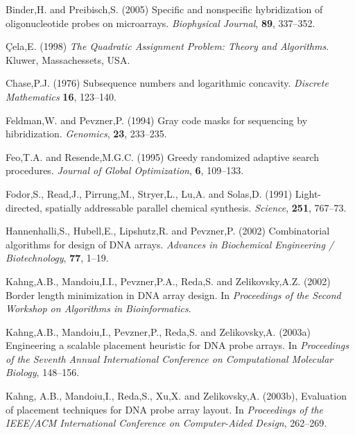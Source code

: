 \documentclass{bioinfo}
\begin{document}
\begin{thebibliography}{}

 Binder,H. and Preibisch,S. (2005) Specific and nonspecific hybridization of oligonucleotide probes on microarrays. {\it Biophysical Journal}, {\bf 89}, 337--352.

 \c{C}ela,E. (1998) {\it The Quadratic Assignment Problem: Theory and Algorithms}. Kluwer, Massachessets, USA.

 Chase,P.J. (1976) Subsequence numbers and logarithmic concavity. {\it Discrete Mathematics} {\bf 16}, 123--140.

 Feldman,W. and Pevzner,P. (1994) Gray code masks for sequencing by hibridization. {\it Genomics}, {\bf 23}, 233--235.

 Feo,T.A. and Resende,M.G.C. (1995) Greedy randomized adaptive search procedures. {\it Journal of Global Optimization}, {\bf 6}, 109--133.

 Fodor,S., Read,J., Pirrung,M., Stryer,L., Lu,A. and Solas,D. (1991) Light-directed, spatially addressable parallel chemical synthesis. {\it Science}, {\bf 251}, 767--73.

 Hannenhalli,S., Hubell,E., Lipshutz,R. and Pevzner,P. (2002) Combinatorial algorithms for design of DNA arrays. {\it Advances in Biochemical Engineering / Biotechnology}, {\bf 77}, 1--19.

 Kahng,A.B., Mandoiu,I.I., Pevzner,P.A., Reda,S. and Zelikovsky,A.Z. (2002) Border length minimization in DNA array design. In {\it Proceedings of the Second Workshop on Algorithms in Bioinformatics}.

 Kahng,A.B., Mandoiu,I., Pevzner,P., Reda,S. and Zelikovsky,A. (2003a) Engineering a scalable placement heuristic for DNA probe arrays. In {\it Proceedings of the Seventh Annual International Conference on Computational Molecular Biology}, 148--156.

 Kahng, A.B., Mandoiu,I., Reda,S., Xu,X. and Zelikovsky,A. (2003b), Evaluation of placement techniques for DNA probe array layout. In {\it Proceedings of the IEEE/ACM International Conference on Computer-Aided Design}, 262--269.


\end{thebibliography}
\end{document}
